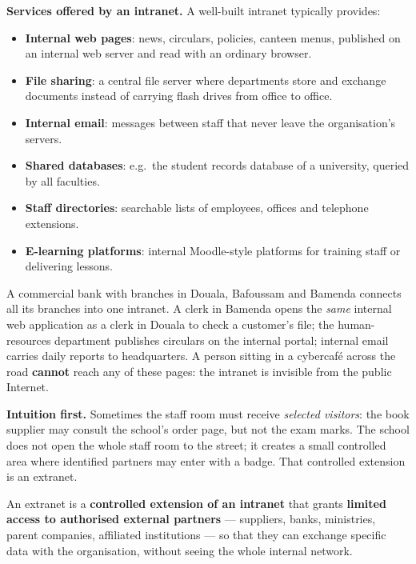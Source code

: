 \documentclass[11pt]{article}
\newcommand{\cle}[1]{{\popxbold\color{popdark}#1}}
\newcounter{popsec}
\newcounter{popsub}
\newcommand{\courssub}[1]{%
  \stepcounter{popsub}%
  \par\vspace{9pt}\noindent{\popxbold\fontsize{11.5}{13}\selectfont\color{popink}{\color{poporange}\thepopsec.\thepopsub}\hspace{6pt}#1}\par\nopagebreak\vspace{4pt}
}
\begin{document}
\textbf{Services offered by an intranet.} A well-built intranet typically provides:

\begin{itemize}
\item \textbf{Internal web pages}: news, circulars, policies, canteen menus, published on an internal web server and read with an ordinary browser.
\item \textbf{File sharing}: a central file server where departments store and exchange documents instead of carrying flash drives from office to office.
\item \textbf{Internal email}: messages between staff that never leave the organisation's servers.
\item \textbf{Shared databases}: e.g.\ the student records database of a university, queried by all faculties.
\item \textbf{Staff directories}: searchable lists of employees, offices and telephone extensions.
\item \textbf{E-learning platforms}: internal Moodle-style platforms for training staff or delivering lessons.
\end{itemize}

\begin{exemplebox}
A commercial bank with branches in Douala, Bafoussam and Bamenda connects all its branches into one intranet. A clerk in Bamenda opens the \emph{same} internal web application as a clerk in Douala to check a customer's file; the human-resources department publishes circulars on the internal portal; internal email carries daily reports to headquarters. A person sitting in a cybercafé across the road \textbf{cannot} reach any of these pages: the intranet is invisible from the public Internet.
\end{exemplebox}

\courssub{What is an Extranet?}

\textbf{Intuition first.} Sometimes the staff room must receive \emph{selected visitors}: the book supplier may consult the school's order page, but not the exam marks. The school does not open the whole staff room to the street; it creates a small controlled area where identified partners may enter with a badge. That controlled extension is an extranet.

\begin{definition}[Extranet]
An \cle{extranet} is a \textbf{controlled extension of an intranet} that grants \textbf{limited access to authorised external partners} --- suppliers, banks, ministries, parent companies, affiliated institutions --- so that they can exchange specific data with the organisation, without seeing the whole internal network.
\end{definition}
\end{document}

